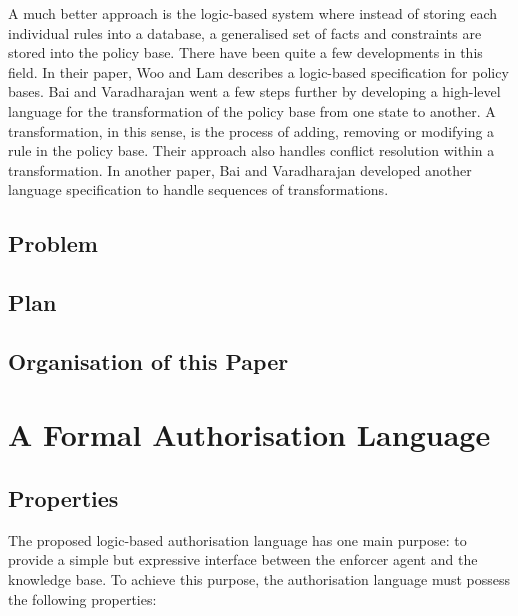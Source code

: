 \documentclass[a4paper,draft]{article}
\begin{document}
      A much better approach is the logic-based system where instead of
      storing each individual rules into a database, a generalised set of
      facts and constraints are stored into the policy base. There have been
      quite a few developments in this field. In their paper, Woo and Lam
      \cite{WL} describes a logic-based specification for policy bases. Bai and
      Varadharajan \cite{BV1} went a few steps further by developing a
      high-level language for the transformation of the policy base from one
      state to another. A transformation, in this sense, is the process of
      adding, removing or modifying a rule in the policy base. Their approach
      also handles conflict resolution within a transformation. In another
      paper, Bai and Varadharajan \cite{BV2} developed another language
      specification to handle sequences of transformations.

    \subsection{Problem}

    \subsection{Plan}

    \subsection{Organisation of this Paper}

    \pagebreak

  \section{A Formal Authorisation Language}

    \subsection{Properties}

      The proposed logic-based authorisation language has one main purpose:
      to provide a simple but expressive interface between the enforcer
      agent and the knowledge base. To achieve this purpose, the authorisation
      language must possess the following properties:
\end{document}
